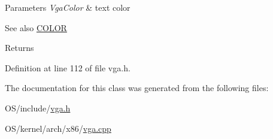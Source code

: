 \begin{DoxyParams}{Parameters}
{\em Vga\+Color} & text color \\
\hline
\end{DoxyParams}
\begin{DoxySeeAlso}{See also}
\hyperlink{namespace_v_g_a_ace1c3156a8d3975ff783ff7a1fa8eb71}{C\+O\+L\+OR} 
\end{DoxySeeAlso}
\begin{DoxyReturn}{Returns}

\end{DoxyReturn}


Definition at line 112 of file vga.\+h.



The documentation for this class was generated from the following files\+:\begin{DoxyCompactItemize}
\item 
O\+S/include/\hyperlink{vga_8h}{vga.\+h}\item 
O\+S/kernel/arch/x86/\hyperlink{vga_8cpp}{vga.\+cpp}\end{DoxyCompactItemize}
